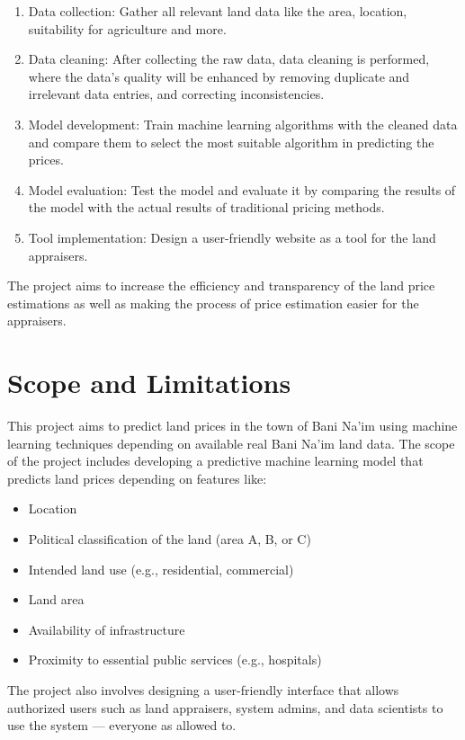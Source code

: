 \documentclass[12pt,oneside]{report}
\begin{document}
\begin{enumerate}[leftmargin=*, label=\arabic*-, align=left]
    \item Data collection: Gather all relevant land data like the area, location, suitability for agriculture and more.
    \item Data cleaning: After collecting the raw data, data cleaning is performed, where the data’s quality will be enhanced by removing duplicate and irrelevant data entries, and correcting inconsistencies.
    \item Model development: Train machine learning algorithms with the cleaned data and compare them to select the most suitable algorithm in predicting the prices.
    \item Model evaluation: Test the model and evaluate it by comparing the results of the model with the actual results of traditional pricing methods.
    \item Tool implementation: Design a user-friendly website as a tool for the land appraisers.
\end{enumerate}

The project aims to increase the efficiency and transparency of the land price estimations as well as making the process of price estimation easier for the appraisers.




\section{Scope and Limitations}
This project aims to predict land prices in the town of Bani Na'im using machine learning techniques depending on available real Bani Na'im land data. 
The scope of the project includes developing a predictive machine learning model that predicts land prices depending on features like:

\begin{itemize}[leftmargin=*]
    \item Location
    \item Political classification of the land (area A, B, or C)
    \item Intended land use (e.g., residential, commercial)
    \item Land area
    \item Availability of infrastructure
    \item Proximity to essential public services (e.g., hospitals)
\end{itemize}

The project also involves designing a user-friendly interface that allows authorized users such as land appraisers, system admins, and data scientists to use the system — everyone as allowed to. 
\end{document}
